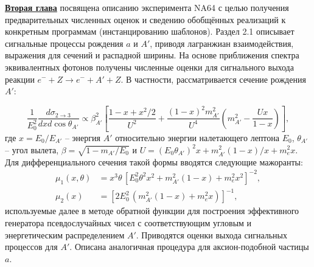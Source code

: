 \underline{\textbf{Вторая глава}} посвящена описанию
эксперимента NA64 с целью получения предварительных численных
оценок и сведению обобщённых реализаций к конкретным программам
(инстанцированию шаблонов).
Раздел 2.1 описывает сигнальные процессы рождения $a$ и $A'$,
приводя лагранжиан взаимодействия, выражения для сечений и
распадной ширины. На основе приближения спектра эквивалентных
фотонов получены численные оценки для сигнального выхода
реакции $e^- + Z \rightarrow e^- + A' + Z$. В частности,
рассматривается сечение рождения $A'$:
\begin{comment}
\[
\frac{1}{E^2_0} \frac{ d \sigma_{3 \rightarrow 2}}{d x d \cos{\theta_{A'}}} =
(8 \alpha \epsilon^2 \chi \beta_{A'}^2) \left[
    \frac{ 1 - x + x^2/2 }{U^2}
    + \frac{ (1-x)^2 m^2_{A'} }{U^4}
        \left( m^2_{A'} - \frac{U x}{1 - x} \right) \right],
\label{eq:bjorkenCS}
\]
где $x = E_0/E_{A'} \in (m_{A'}/E_0, 1 - m_{A'}/E_0)$ -- относительная энергия
$A'$, $\theta_{A'} \in [0, \pi]$ -- угол вылета, относительная скорость
$\beta = \sqrt{ 1 - m_{A'}/E_0 }$, и
$U = (E_0 \theta_{A'} )^2 x + m^2_{A'} (1-x)/x + m_e^2 x$.
Эффективный поток фотонов $\chi$ даётся интегральным выражением:
\begin{equation}
\chi = \int_{t_{min}}^{t_{max}} d t \frac{t - t_{min}}{t^2} G_2 (t),
\label{eq:photoFlux}
\end{equation}
где $G_2(t) = G_{2, el} + G_{2, inel}$ -- общий электромагнитный форм-фактор
\end{comment}
\[
\frac{1}{E^2_0} \frac{ d \sigma_{2 \rightarrow 3}}{d x d \cos{\theta_{A'}}} \propto
\beta_{A'}^2 \left[
    \frac{ 1 - x + x^2/2 }{U^2}
    + \frac{ (1-x)^2 m^2_{A'} }{U^4}
        \left( m^2_{A'} - \frac{U x}{1 - x} \right) \right],
\label{eq:bjorkenCS}
\]
где $x = E_0/E_{A'}$ -- энергия $A'$ относительно энергии
налетающего лептона $E_0$,
$\theta_{A'}$ -- угол вылета,
$\beta = \sqrt{ 1 - m_{A'}/E_0 }$ и
$U = (E_0 \theta_{A'} )^2 x + m^2_{A'} (1-x)/x + m_e^2 x$.
Для дифференциального сечения такой формы вводятся следующие мажоранты:
\begin{equation*}
\begin{aligned}
    \mu_1(x, \theta) &= x^3 \theta \, 
        [E_0^2 \theta^2 x^2 + m_{A'}^2(1-x) + m_e^2 x^2]^{-2}, \\
    \mu_2(x) &= [2 E_0^2 \, (m_{A'}^2 (1 - x) + m_e^2 x ) ]^{-1},
\end{aligned}
\end{equation*}
используемые далее в методе обратной функции для построения
эффективного генератора псевдослучайных чисел с соответствующим
угловым и энергетическим распределением $A'$.
Приводятся оценки выхода сигнальных процессов для $A'$.
Описана аналогичная процедура для аксион-подобной частицы $a$.

